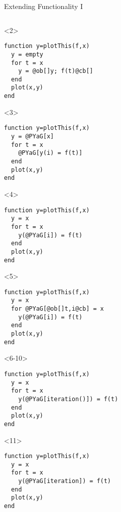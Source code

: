 \begin{frame}[fragile,t]{Extending Functionality I}
  \begin{columns}[T]
    \begin{column}{5cm}
      \begin{onlyenv}<2>
        \begin{Verbatim}[commandchars=@\[\]]
function y=plotThis(f,x)
  y = empty
  for t = x
    y = @ob[]y; f(t)@cb[]
  end
  plot(x,y)
end
        \end{Verbatim}
      \end{onlyenv}
      \begin{onlyenv}<3>
        \begin{Verbatim}[commandchars=@\[\]]
function y=plotThis(f,x)
  y = @PYaG[x]
  for t = x
    @PYaG[y(i) = f(t)]
  end
  plot(x,y)
end
        \end{Verbatim}
          \end{onlyenv}
          \begin{onlyenv}<4>
        \begin{Verbatim}[commandchars=@\[\]]
function y=plotThis(f,x)
  y = x
  for t = x
    y(@PYaG[i]) = f(t)
  end
  plot(x,y)
end
        \end{Verbatim}
          \end{onlyenv}
          \begin{onlyenv}<5>
        \begin{Verbatim}[commandchars=@\[\]]
function y=plotThis(f,x)
  y = x
  for @PYaG[@ob[]t,i@cb] = x
    y(@PYaG[i]) = f(t)
  end
  plot(x,y)
end
        \end{Verbatim}
          \end{onlyenv}
          \begin{onlyenv}<6-10>
        \begin{Verbatim}[commandchars=@\[\]]
function y=plotThis(f,x)
  y = x
  for t = x
    y(@PYaG[iteration()]) = f(t)
  end
  plot(x,y)
end
        \end{Verbatim}
          \end{onlyenv}
          \begin{onlyenv}<11>
        \begin{Verbatim}[commandchars=@\[\]]
function y=plotThis(f,x)
  y = x
  for t = x
    y(@PYaG[iteration]) = f(t)
  end
  plot(x,y)
end
        \end{Verbatim}
          \end{onlyenv}
      \end{column}


\end{columns}
\end{frame}
